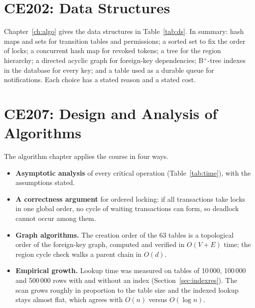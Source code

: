 \section{CE202: Data Structures}
Chapter~\ref{ch:algo} gives the data structures in Table~\ref{tab:ds}. In summary:
hash maps and sets for transition tables and permissions; a sorted set to fix the order of
locks; a concurrent hash map for revoked tokens; a tree for the region hierarchy; a
directed acyclic graph for foreign-key dependencies; B$^+$-tree indexes in the database
for every key; and a table used as a durable queue for notifications. Each choice has a
stated reason and a stated cost.

\section{CE207: Design and Analysis of Algorithms}
The algorithm chapter applies the course in four ways.
\begin{itemize}
\item \textbf{Asymptotic analysis} of every critical operation (Table~\ref{tab:time}), with the assumptions stated.
\item \textbf{A correctness argument} for ordered locking: if all transactions take locks in one global order, no cycle of waiting transactions can form, so deadlock cannot occur among them.
\item \textbf{Graph algorithms.} The creation order of the 63 tables is a topological order of the foreign-key graph, computed and verified in $O(V+E)$ time; the region cycle check walks a parent chain in $O(d)$.
\item \textbf{Empirical growth.} Lookup time was measured on tables of 10\,000, 100\,000 and 500\,000 rows with and without an index (Section~\ref{sec:indexres}). The scan grows roughly in proportion to the table size and the indexed lookup stays almost flat, which agrees with $O(n)$ versus $O(\log n)$.
\end{itemize}

